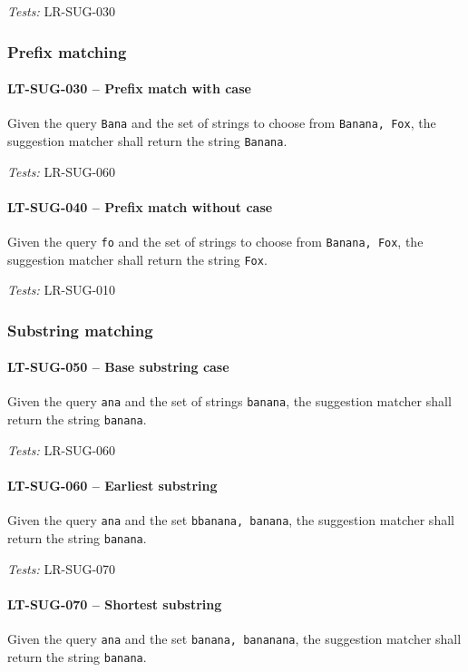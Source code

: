 \textit{Tests: } LR-SUG-030

\subsubsection{Prefix matching}
\paragraph{LT-SUG-030 -- Prefix match with case}
Given the query \lstinline{Bana} and the set of strings to choose
from \lstinline{Banana, Fox}, the suggestion matcher shall
return the string \lstinline{Banana}.

\textit{Tests: } LR-SUG-060

\paragraph{LT-SUG-040 -- Prefix match without case}
Given the query \lstinline{fo} and the set of strings to choose from
\lstinline{Banana, Fox}, the suggestion matcher shall return
the string \lstinline{Fox}.

\textit{Tests: } LR-SUG-010

\subsubsection{Substring matching}
\paragraph{LT-SUG-050 -- Base substring case}
Given the query \lstinline{ana} and the set of strings
\lstinline{banana}, the suggestion matcher shall return the
string \lstinline{banana}.

\textit{Tests: } LR-SUG-060

\paragraph{LT-SUG-060 -- Earliest substring}
Given the query \lstinline{ana} and the set \lstinline{bbanana, banana},
the suggestion matcher shall return the string \lstinline{banana}.

\textit{Tests: } LR-SUG-070

\paragraph{LT-SUG-070 -- Shortest substring}
Given the query \lstinline{ana} and the set \lstinline{banana, bananana},
the suggestion matcher shall return the string \lstinline{banana}.

